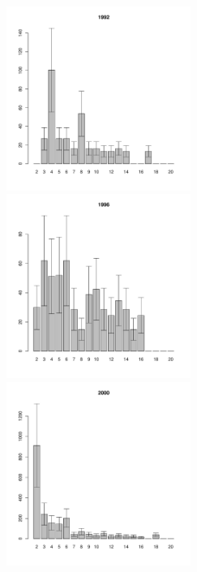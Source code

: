 	\begin{figure}[hp]

	\begin{minipage}[b]{.3\linewidth}
	\begin{center}
	\includegraphics[width=60mm]{../White_Sea/Luvenga_II_razrez/zostera_zone2_1992_.pdf}	
	\end{center}
	\end{minipage}
	\hfil %
	\begin{minipage}[b]{.3\linewidth}
	\begin{center}
	\includegraphics[width=60mm]{../White_Sea/Luvenga_II_razrez/zostera_zone2_1996_.pdf}
	\end{center}
	\end{minipage}
	\hfil %
	\begin{minipage}[b]{.3\linewidth}
	\begin{center}
\includegraphics[width=60mm]{../White_Sea/Luvenga_II_razrez/zostera_zone2_2000_.pdf}

\end{center}
\end{minipage}
\end{figure}
